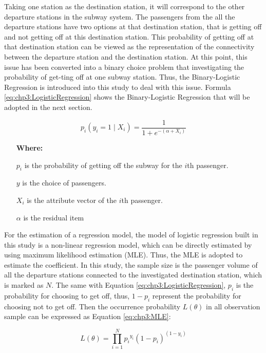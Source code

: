 %
Taking one station as the destination station, it will correspond to the other departure stations in the subway system. The passengers from the all the departure stations have two options at that destination station, that is getting off and not getting off at this destination station. This probability of getting off at that destination station can be viewed as the representation of the connectivity between the departure station and the destination station. At this point, this issue has been converted into a binary choice problem that investigating the probability of get-ting off at one subway station. Thus, the Binary-Logistic Regression is introduced into this study to deal with this issue. Formula \ref{eq:chp3:LogisticRegression} shows the Binary-Logistic Regression that will be adopted in the next section.

\begin{equation}
	p_i(y_i=1 \mid X_i)=\frac{1}{1+e^{-(\alpha +X_i)}}
	\label{eq:chp3:LogisticRegression}
\end{equation}

\begin{enumerate}
	\item[\textbf{Where:}]
	\item[$p_i$] is the probability of getting off the subway for the $i$th passenger.
	\item[$y$] is the choice of passengers.
	\item[$X_i$] is the attribute vector of the $i$th passenger.
	\item[$\alpha$] is the residual item
\end{enumerate}

%
For the estimation of a regression model, the model of logistic regression built in this study is a non-linear regression model, which can be directly estimated by using maximum likelihood estimation (MLE). Thus, the MLE is adopted to estimate the coefficient. In this study, the sample size is the passenger volume of all the departure stations connected to the investigated destination station, which is marked as $N$. The same with Equation \ref{eq:chp3:LogisticRegression}, $p_i$ is the probability for choosing to get off, thus, $1-p_i$ represent the probability for choosing not to get off. Then the occurrence probability $L(\theta)$ in all observation sample can be expressed as Equation \ref{eq:chp3:MLE}:

\begin{equation}
	L(\theta)=\prod_{i=1}^{N}{p_i}^{y_i}(1-p_i)^{(1-y_i)}
	\label{eq:chp3:MLE}
\end{equation}

